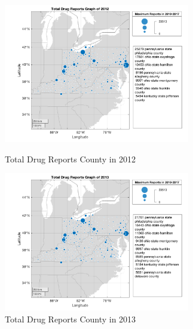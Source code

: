 \documentclass{mcmthesis}
\begin{document}
\begin{appendices}
\begin{figure}[H]
\centering
\begin{minipage}[t]{0.45\textwidth}
\centering
\includegraphics[width=3.2in]{figures/TotalDrugReportsCounty2012.png}
\caption{Total Drug Reports County in 2012}
\label{Total Drug Reports County in 2012}
\end{minipage}
\hfill
\begin{minipage}[t]{0.45\textwidth}
\centering
\includegraphics[width=3.2in]{figures/TotalDrugReportsCounty2013.png}
\caption{Total Drug Reports County in 2013}
\label{Total Drug Reports County in 2013}
\end{minipage}
\end{figure}


\end{appendices}
\end{document}
